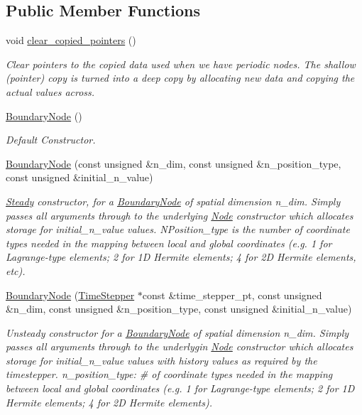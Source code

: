 \subsection*{Public Member Functions}
\begin{DoxyCompactItemize}
\item 
void \hyperlink{classoomph_1_1BoundaryNode_a8310f571e69ee1d3f9de4fd4ac32c656}{clear\+\_\+copied\+\_\+pointers} ()
\begin{DoxyCompactList}\small\item\em Clear pointers to the copied data used when we have periodic nodes. The shallow (pointer) copy is turned into a deep copy by allocating new data and copying the actual values across. \end{DoxyCompactList}\item 
\hyperlink{classoomph_1_1BoundaryNode_aae4348d85debf5606c286e582bf0e475}{Boundary\+Node} ()
\begin{DoxyCompactList}\small\item\em Default Constructor. \end{DoxyCompactList}\item 
\hyperlink{classoomph_1_1BoundaryNode_a3d76a60cda13edec1549693fc6e49214}{Boundary\+Node} (const unsigned \&n\+\_\+dim, const unsigned \&n\+\_\+position\+\_\+type, const unsigned \&initial\+\_\+n\+\_\+value)
\begin{DoxyCompactList}\small\item\em \hyperlink{classoomph_1_1Steady}{Steady} constructor, for a \hyperlink{classoomph_1_1BoundaryNode}{Boundary\+Node} of spatial dimension n\+\_\+dim. Simply passes all arguments through to the underlying \hyperlink{classoomph_1_1Node}{Node} constructor which allocates storage for initial\+\_\+n\+\_\+value values. N\+Position\+\_\+type is the number of coordinate types needed in the mapping between local and global coordinates (e.\+g. 1 for Lagrange-\/type elements; 2 for 1D Hermite elements; 4 for 2D Hermite elements, etc). \end{DoxyCompactList}\item 
\hyperlink{classoomph_1_1BoundaryNode_a1a18c0a20d10ae670671de9600846edb}{Boundary\+Node} (\hyperlink{classoomph_1_1TimeStepper}{Time\+Stepper} $\ast$const \&time\+\_\+stepper\+\_\+pt, const unsigned \&n\+\_\+dim, const unsigned \&n\+\_\+position\+\_\+type, const unsigned \&initial\+\_\+n\+\_\+value)
\begin{DoxyCompactList}\small\item\em Unsteady constructor for a \hyperlink{classoomph_1_1BoundaryNode}{Boundary\+Node} of spatial dimension n\+\_\+dim. Simply passes all arguments through to the underlygin \hyperlink{classoomph_1_1Node}{Node} constructor which allocates storage for initial\+\_\+n\+\_\+value values with history values as required by the timestepper. n\+\_\+position\+\_\+type\+: \# of coordinate types needed in the mapping between local and global coordinates (e.\+g. 1 for Lagrange-\/type elements; 2 for 1D Hermite elements; 4 for 2D Hermite elements). \end{DoxyCompactList}\item 

\end{DoxyCompactItemize}
